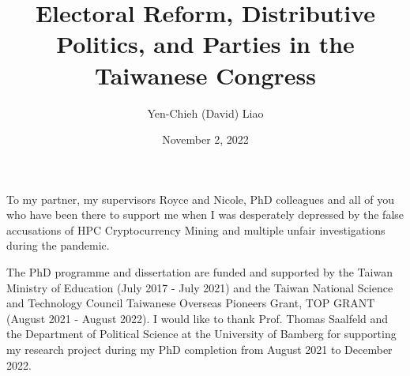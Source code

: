 \documentclass[12pt,leqno]{report}
\begin{document}
\sloppy
\title{Electoral Reform, Distributive Politics, 
            and Parties in the Taiwanese Congress} 
\author{Yen-Chieh (David) Liao}

\date{November 2, 2022}

\maketitle

\thispagestyle{plain}
\newenvironment{dedication}
{\cleardoublepage {}
  \begin{center} \em}
  {\end{center} \vspace*{\stretch{3}} }
\begin{dedication}

To my partner, my supervisors Royce and Nicole, PhD colleagues and all of you who have been there to support me when I was desperately depressed by the false accusations of HPC Cryptocurrency Mining and multiple unfair investigations during the pandemic.

\end{dedication}

\begin{acknowledgments}
The PhD programme and dissertation are funded and supported by the Taiwan Ministry of Education (July 2017 - July 2021) and the Taiwan National Science and Technology Council Taiwanese Overseas Pioneers Grant, TOP GRANT (August 2021 - August 2022). I would like to thank Prof. Thomas Saalfeld and the Department of Political Science at the University of Bamberg for supporting my research project during my PhD completion from August 2021 to December 2022.
\end{acknowledgments}

\tableofcontents

\listoftables

\listoffigures

\begin{abstract}

\end{abstract}
\end{document}
